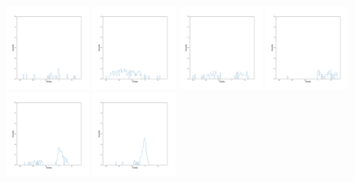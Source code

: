 \documentclass[12pt,prd]{article}
\begin{document}
\begin{figure}[h!]
\includegraphics[width=0.24\textwidth]{../figures/stars_near_zero_rahistgaiascan_l22_5_b74_4_ra209_6_dec23_3_npy_4.pdf}
\includegraphics[width=0.24\textwidth]{../figures/stars_near_zero_rahistgaiascan_l22_5_b74_4_ra209_6_dec23_3_npy_5.pdf}
\includegraphics[width=0.24\textwidth]{../figures/stars_near_zero_rahistgaiascan_l22_5_b74_4_ra209_6_dec23_3_npy_6.pdf}
\includegraphics[width=0.24\textwidth]{../figures/stars_near_zero_rahistgaiascan_l22_5_b74_4_ra209_6_dec23_3_npy_7.pdf}
\includegraphics[width=0.24\textwidth]{../figures/stars_near_zero_rahistgaiascan_l22_5_b74_4_ra209_6_dec23_3_npy_8.pdf}
\includegraphics[width=0.24\textwidth]{../figures/stars_near_zero_rahistgaiascan_l22_5_b74_4_ra209_6_dec23_3_npy_9.pdf}

\end{figure}
\end{document}
